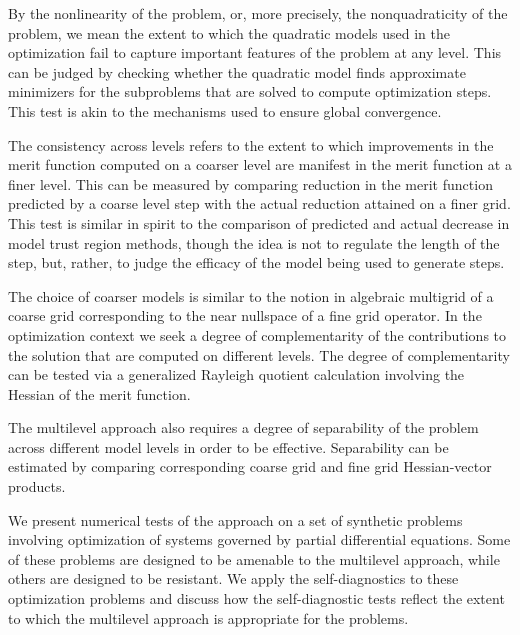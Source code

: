 \documentclass{report}
\begin{document}
By the nonlinearity of the problem, or, more precisely, the nonquadraticity of
the problem, we mean the extent to which the quadratic models used in the
optimization fail to capture important features of the problem at any level.
This can be judged by checking whether the quadratic model finds approximate
minimizers for the subproblems that are solved to compute optimization steps.
This test is akin to the mechanisms used to ensure global convergence.

The consistency across levels refers to the extent to which improvements
in the merit function computed on a coarser level are manifest in the merit
function at a finer level. This can be measured by comparing reduction in the
merit function predicted by a coarse level step with the actual reduction
attained on a finer grid. This test is similar in spirit to the comparison
of predicted and actual decrease in model trust region methods, though the
idea is not to regulate the length of the step, but, rather, to judge the
efficacy of the model being used to generate steps.

The choice of coarser models is similar to the notion in algebraic multigrid
of a coarse grid corresponding to the near nullspace of a fine grid operator.
In the optimization context we seek a degree of complementarity of the
contributions to the solution that are computed on different levels. The
degree of complementarity can be tested via a generalized Rayleigh quotient
calculation involving the Hessian of the merit function.

The multilevel approach also requires a degree of separability of the problem
across different model levels in order to be effective. Separability can be
estimated by comparing corresponding coarse grid and fine grid Hessian-vector
products.

We present numerical tests of the approach on a set of synthetic problems
involving optimization of systems governed by partial differential equations.
Some of these problems are designed to be amenable to the multilevel approach,
while others are designed to be resistant. We apply the self-diagnostics to
these optimization problems and discuss how the self-diagnostic tests reflect
the extent to which the multilevel approach is appropriate for the problems.
\end{document}

